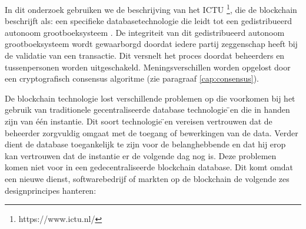 In dit onderzoek gebruiken we de beschrijving van het ICTU \footnote{https://www.ictu.nl/}, die de blockchain beschrijft als: een specifieke databasetechnologie die leidt tot een gedistribueerd autonoom grootboeksysteem \cite{kaptijn}. De integriteit van dit gedistribueerd autonoom grootboeksysteem wordt gewaarborgd doordat iedere partij zeggenschap heeft bij de validatie van een transactie. Dit versnelt het proces doordat beheerders en tussenpersonen worden uitgeschakeld. Meningsverschillen worden opgelost door een cryptografisch consensus algoritme (zie paragraaf \ref{cap:consensus}).\par

De blockchain technologie lost verschillende problemen op die voorkomen bij het gebruik van traditionele gecentraliseerde database technologie ̈en die in handen zijn van één instantie. Dit soort technologie ̈en vereisen vertrouwen dat de beheerder zorgvuldig omgaat met de toegang of bewerkingen van de data. Verder dient de database toegankelijk te zijn voor de belanghebbende en dat hij erop kan vertrouwen dat de instantie er de volgende dag nog is. Deze problemen komen niet voor in een gedecentraliseerde blockchain database. Dit komt omdat een nieuwe dienst, softwarebedrijf of markten op de blockchain de volgende zes designprincipes \cite{blockRev} hanteren:
